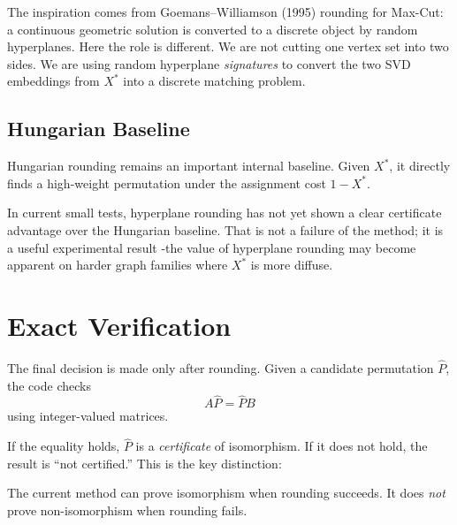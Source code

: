 \documentclass[12pt,a4paper]{article}
\begin{document}
The inspiration comes from Goemans--Williamson (1995) rounding for Max-Cut: a
continuous geometric solution is converted to a discrete object by random
hyperplanes.  Here the role is different.  We are not cutting one vertex set
into two sides.  We are using random hyperplane \emph{signatures} to convert
the two SVD embeddings from $X^*$ into a discrete matching problem.

\subsection{Hungarian Baseline}

Hungarian rounding remains an important internal baseline.  Given $X^*$, it
directly finds a high-weight permutation under the assignment cost $1 - X^*$.

In current small tests, hyperplane rounding has not yet shown a clear
certificate advantage over the Hungarian baseline.  That is not a failure of
the method; it is a useful experimental result -the value of hyperplane
rounding may become apparent on harder graph families where $X^*$ is more
diffuse.

\section{Exact Verification}\label{sec:verification}

The final decision is made only after rounding.  Given a candidate permutation
$\hat{P}$, the code checks
\begin{equation}\label{eq:cert}
  A\hat{P} = \hat{P}B
\end{equation}
using integer-valued matrices.

If the equality holds, $\hat{P}$ is a \emph{certificate} of isomorphism.  If it
does not hold, the result is ``not certified.''  This is the key distinction:

\begin{center}
\end{center}

\noindent The current method can prove isomorphism when rounding succeeds.  It
does \emph{not} prove non-isomorphism when rounding fails.
\end{document}
